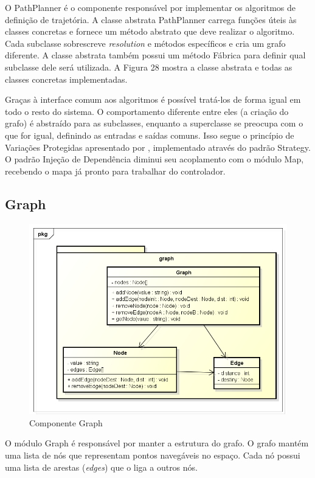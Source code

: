 O PathPlanner é o componente responsável por implementar os algoritmos de definição de trajetória. A classe abstrata PathPlanner carrega funções úteis às classes concretas e fornece um método abstrato que deve realizar o algoritmo. Cada subclasse sobrescreve \textit{resolution} e métodos específicos e cria um grafo diferente. A classe abstrata também possui um método Fábrica para definir qual subclasse dele será utilizada. A Figura 28 mostra a classe abstrata e todas as classes concretas implementadas.

Graças à interface comum aos algoritmos é possível tratá-los de forma igual em todo o resto do sistema. O comportamento diferente entre eles (a criação do grafo) é abstraído para as subclasses, enquanto a superclasse se preocupa com o que for igual, definindo as entradas e saídas comuns. Isso segue o princípio de Variações Protegidas apresentado por \cite{Larman2005}, implementado através do padrão Strategy. O padrão Injeção de Dependência diminui seu acoplamento com o módulo Map, recebendo o mapa já pronto para trabalhar do controlador.

\subsection{Graph}

\begin{figure}[h]
	\centering
	\label{fig29}
		\includegraphics[keepaspectratio=true,scale=0.5]{figuras/pkggraph.png}
	\caption{Componente Graph}
\end{figure}

O módulo Graph é responsável por manter a estrutura do grafo. O grafo mantém uma lista de nós que representam pontos navegáveis no espaço. Cada nó possui uma lista de arestas (\textit{edges}) que o liga a outros nós.


